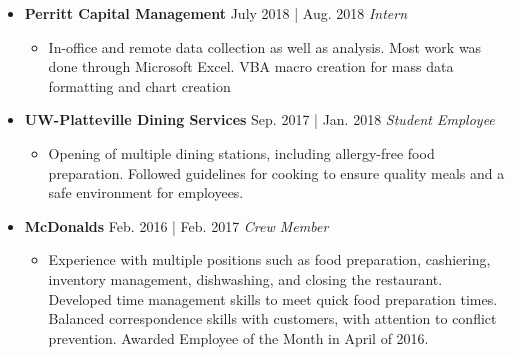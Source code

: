 \documentclass[11pt]{article}
\newcommand{\job}[3]{\vspace{1.5mm}
  \textbf{#1} \hfill #2 \linebreak \textit{#3}
}
\begin{document}
\begin{itemize}[leftmargin=*]
	      {Undergraduate Researcher}
	      \begin{itemize}
	      	\item 1 out of 10 students from the university to receive the 2019 SUSP grant. Worked under Dr. Selent to research, design, and develop multiple predictive models used to predict student struggle in future CSSE courses.
	      	\item Previously involved in multiple research groups under Dr. Alkhushayni. Primary group developed an Android application developed to be used for personal health data entry, storage, and analysis. Implemented a unique set of chronic disease risk assessments.
	      \end{itemize}
	\item[]
	      \job
	      {Perritt Capital Management}
	      {July 2018 | Aug. 2018}
	      {Intern}
	      \begin{itemize}
	      	\item In-office and remote data collection as well as analysis. Most work was done through Microsoft Excel. VBA macro creation for mass data formatting and chart creation
	      \end{itemize}
	\item[]
	      \job
	      {UW-Platteville Dining Services}
	      {Sep. 2017 | Jan. 2018}
	      {Student Employee}
	      \begin{itemize}
	      	\item Opening of multiple dining stations, including allergy-free food preparation. Followed guidelines for cooking to ensure quality meals and a safe environment for employees.
	      \end{itemize}
	\item[]
	      \job
	      {McDonald\textquotesingle{}s}
	      {Feb. 2016 | Feb. 2017}
	      {Crew Member}
	      \begin{itemize}
	      	\item Experience with multiple positions such as food preparation, cashiering, inventory management, dishwashing, and closing the restaurant. Developed time management skills to meet quick food preparation times. Balanced correspondence skills with customers, with attention to conflict prevention. Awarded Employee of the Month in April of 2016.
	      \end{itemize}
\end{itemize}
\ 
\end{document}
